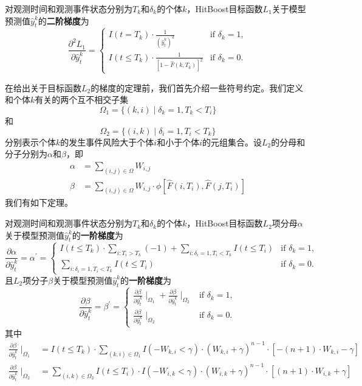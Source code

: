 \begin{theorem}\label{thm:1.2}
对观测时间和观测事件状态分别为$T_k$和$\delta_k$的个体$k$，HitBoost目标函数$L_1$关于模型预测值$\hat{y}_t^k$的\textbf{二阶梯度}为$$
\frac{\partial^2 L_1}{\partial \hat{y}_t^k}=
\begin{cases}
I(t=T_k)\cdot \frac{1}{{(\hat{y}_t^k)}^2} & \text{if } \delta_k = 1,\\
I(t\le T_k)\cdot \frac{1}{{[1-\hat{F}(k, T_k)]}^2} & \text{if } \delta_k = 0.
\end{cases}
$$
\end{theorem}

在给出关于目标函数$L_2$的梯度的定理前，我们首先介绍一些符号约定。我们定义和个体$k$有关的两个互不相交子集$$
\Omega_1=\{(k,i) \mid \delta_k=1,T_k < T_i\}
$$
和$$
\Omega_2=\{(i,k) \mid \delta_i=1,T_i < T_k\}
$$
分别表示个体$k$的发生事件风险大于个体$i$和小于个体$i$的元组集合。设$L_2$的分母和分子分别为$\alpha$和$\beta$，即\[
\begin{split}
\alpha &= \sum_{(i,j)\in \Omega} W_{i,j}\\
\beta &= \sum_{(i,j)\in \Omega} W_{i,j} \cdot \phi\left[ \hat{F}(i, T_i), \hat{F}(j, T_i) \right]
\end{split}
\]
我们有如下定理。

\begin{theorem}\label{thm:1.3}
对观测时间和观测事件状态分别为$T_k$和$\delta_k$的个体$k$，HitBoost目标函数$L_2$项分母$\alpha$关于模型预测值$\hat{y}_t^k$的\textbf{一阶梯度}为$$
\frac{\partial \alpha}{\partial \hat{y}_t^k}=\alpha^{'}=
\begin{cases}
I(t\le T_k)\cdot {\sum\limits_{i: T_i>T_k}(-1)} + \sum\limits_{i: \delta_i=1,T_i<T_k} I(t\le T_i) & \text{if } \delta_k = 1,\\
\sum\limits_{i: \delta_i=1,T_i<T_k} I(t\le T_i) & \text{if } \delta_k = 0.
\end{cases}
$$ 且$L_2$项分子$\beta$关于模型预测值$\hat{y}_t^k$的\textbf{一阶梯度}为$$
\frac{\partial \beta}{\partial \hat{y}_t^k}=\beta^{'}=
\begin{cases}
\frac{\partial \beta}{\partial \hat{y}_t^k} \mid_{\Omega_1} + \frac{\partial \beta}{\partial \hat{y}_t^k} \mid_{\Omega_2} & \text{if } \delta_k = 1,\\
\frac{\partial \beta}{\partial \hat{y}_t^k} \mid_{\Omega_2} & \text{if } \delta_k = 0.
\end{cases}
$$ 其中\[
\begin{split}
\frac{\partial \beta}{\partial \hat{y}_t^k} \mid_{\Omega_1} &= I(t\le T_k)\cdot \sum\limits_{(k,i)\in \Omega_1} {I(-W_{k,i}<\gamma)\cdot (W_{k,i}+\gamma)^{n-1}\cdot [-(n+1)\cdot W_{k,i}-\gamma]} \\
\frac{\partial \beta}{\partial \hat{y}_t^k} \mid_{\Omega_2} &= \sum\limits_{(i,k)\in \Omega_2} {I(t\le T_i)\cdot I(-W_{i,k}<\gamma)\cdot (W_{i,k}+\gamma)^{n-1}\cdot [(n+1)\cdot W_{i,k}+\gamma]}
\end{split}
\]
\end{theorem}

